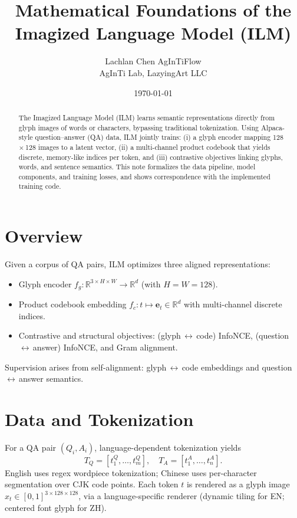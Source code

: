 \documentclass[11pt]{article}
\title{Mathematical Foundations of the Imagized Language Model (ILM)}
\author{\begin{tabular}{c}Lachlan Chen \quad AgInTiFlow\\AgInTi Lab, LazyingArt LLC\end{tabular}}
\date{\today}
\begin{document}
\maketitle

\begin{abstract}
The Imagized Language Model (ILM) learns semantic representations directly from glyph images of words or characters, bypassing traditional tokenization. Using Alpaca-style question--answer (QA) data, ILM jointly trains: (i) a glyph encoder mapping 128\,\(\times\)\,128 images to a latent vector, (ii) a multi-channel product codebook that yields discrete, memory-like indices per token, and (iii) contrastive objectives linking glyphs, words, and sentence semantics. This note formalizes the data pipeline, model components, and training losses, and shows correspondence with the implemented training code.
\end{abstract}

\section{Overview}
Given a corpus of QA pairs, ILM optimizes three aligned representations:
\begin{itemize}
  \item Glyph encoder \( f_g : \mathbb{R}^{3\times H\times W} \to \mathbb{R}^d \) (with \(H=W=128\)).
  \item Product codebook embedding \( f_c : t \mapsto \mathbf{e}_t \in \mathbb{R}^d \) with multi-channel discrete indices.
  \item Contrastive and structural objectives: (glyph\,\(\leftrightarrow\)\,code) InfoNCE, (question\,\(\leftrightarrow\)\,answer) InfoNCE, and Gram alignment.
\end{itemize}

Supervision arises from self-alignment: glyph\,\(\leftrightarrow\)\,code embeddings and question\,\(\leftrightarrow\)\,answer semantics.

\section{Data and Tokenization}
For a QA pair \((Q_i, A_i)\), language-dependent tokenization yields
\[
  T_Q = [t_1^Q,\ldots,t_m^Q],\quad T_A = [t_1^A,\ldots,t_n^A].
\]
English uses regex wordpiece tokenization; Chinese uses per-character segmentation over CJK code points. Each token \(t\) is rendered as a glyph image \(x_t \in [0,1]^{3\times 128\times 128}\), via a language-specific renderer (dynamic tiling for EN; centered font glyph for ZH).
\end{document}
